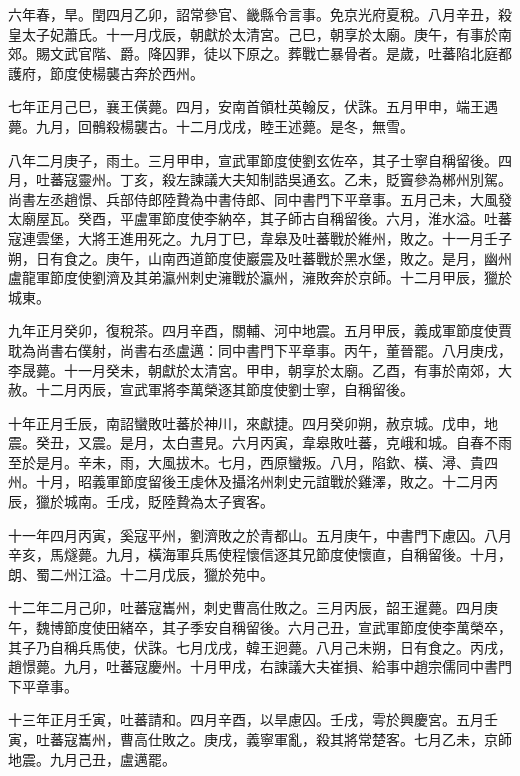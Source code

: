 \begin{pinyinscope}
 六年春，旱。閏四月乙卯，詔常參官、畿縣令言事。免京光府夏稅。八月辛丑，殺皇太子妃蕭氏。十一月戊辰，朝獻於太清宮。己巳，朝享於太廟。庚午，有事於南郊。賜文武官階、爵。降囚罪，徒以下原之。葬戰亡暴骨者。是歲，吐蕃陷北庭都護府，節度使楊襲古奔於西州。



 七年正月己巳，襄王僙薨。四月，安南首領杜英翰反，伏誅。五月甲申，端王遇薨。九月，回鶻殺楊襲古。十二月戊戌，睦王述薨。是冬，無雪。



 八年二月庚子，雨土。三月甲申，宣武軍節度使劉玄佐卒，其子士寧自稱留後。四月，吐蕃寇靈州。丁亥，殺左諫議大夫知制誥吳通玄。乙未，貶竇參為郴州別駕。尚書左丞趙憬、兵部侍郎陸贄為中書侍郎、同中書門下平章事。五月己未，大風發太廟屋瓦。癸酉，平盧軍節度使李納卒，其子師古自稱留後。六月，淮水溢。吐蕃寇連雲堡，大將王進用死之。九月丁巳，韋皋及吐蕃戰於維州，敗之。十一月壬子朔，日有食之。庚午，山南西道節度使巖震及吐蕃戰於黑水堡，敗之。是月，幽州盧龍軍節度使劉濟及其弟瀛州刺史澭戰於瀛州，澭敗奔於京師。十二月甲辰，獵於城東。



 九年正月癸卯，復稅茶。四月辛酉，關輔、河中地震。五月甲辰，義成軍節度使賈耽為尚書右僕射，尚書右丞盧邁：同中書門下平章事。丙午，董晉罷。八月庚戌，李晟薨。十一月癸未，朝獻於太清宮。甲申，朝享於太廟。乙酉，有事於南郊，大赦。十二月丙辰，宣武軍將李萬榮逐其節度使劉士寧，自稱留後。



 十年正月壬辰，南詔蠻敗吐蕃於神川，來獻捷。四月癸卯朔，赦京城。戊申，地震。癸丑，又震。是月，太白晝見。六月丙寅，韋皋敗吐蕃，克峨和城。自春不雨至於是月。辛未，雨，大風拔木。七月，西原蠻叛。八月，陷欽、橫、潯、貴四州。十月，昭義軍節度留後王虔休及攝洺州刺史元誼戰於雞澤，敗之。十二月丙辰，獵於城南。壬戌，貶陸贄為太子賓客。



 十一年四月丙寅，奚寇平州，劉濟敗之於青都山。五月庚午，中書門下慮囚。八月辛亥，馬燧薨。九月，橫海軍兵馬使程懷信逐其兄節度使懷直，自稱留後。十月，朗、蜀二州江溢。十二月戊辰，獵於苑中。



 十二年二月己卯，吐蕃寇巂州，刺史曹高仕敗之。三月丙辰，韶王暹薨。四月庚午，魏博節度使田緒卒，其子季安自稱留後。六月己丑，宣武軍節度使李萬榮卒，其子乃自稱兵馬使，伏誅。七月戊戌，韓王迥薨。八月己未朔，日有食之。丙戌，趙憬薨。九月，吐蕃寇慶州。十月甲戌，右諫議大夫崔損、給事中趙宗儒同中書門下平章事。



 十三年正月壬寅，吐蕃請和。四月辛酉，以旱慮囚。壬戌，雩於興慶宮。五月壬寅，吐蕃寇巂州，曹高仕敗之。庚戌，義寧軍亂，殺其將常楚客。七月乙未，京師地震。九月己丑，盧邁罷。




\end{pinyinscope}

